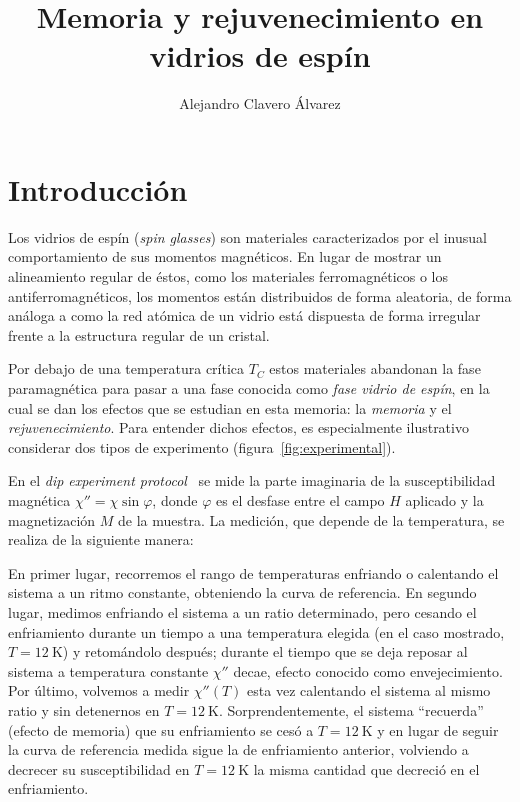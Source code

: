 \documentclass[11pt]{report}
\title{Memoria y rejuvenecimiento en vidrios de espín}
\author{Alejandro Clavero Álvarez}
\newcommand{\sub}[1]{ _{{\scriptscriptstyle \mathit{#1}}}  }
\begin{document}





\tableofcontents


\chapter{Introducción}

Los vidrios de espín
(\textit{spin glasses}) son materiales
caracterizados por el inusual comportamiento de sus momentos
magnéticos. En lugar de mostrar un alineamiento regular de éstos, como
los materiales ferromagnéticos o los antiferromagnéticos, los momentos
están distribuidos de forma aleatoria, de forma análoga a como la red
atómica de un vidrio está dispuesta de forma irregular frente a la
estructura regular de un cristal.

Por debajo de una temperatura crítica $T\sub{C}$ estos
materiales abandonan la fase paramagnética para pasar a una fase
conocida como \emph{fase vidrio de espín}, en la cual se dan los
efectos que se estudian en esta memoria: la \emph{memoria} y el
\emph{rejuvenecimiento}. Para entender dichos efectos, es
especialmente ilustrativo considerar dos tipos de experimento
(figura~\ref{fig:experimental}).

En el \textit{dip experiment protocol}~\cite{dippaper} se mide la
parte imaginaria de la susceptibilidad magnética $χ''=χ \sin φ$, donde
$φ$ es el desfase entre el campo $H$ aplicado y la magnetización $M$
de la muestra. La medición, que depende de la temperatura, se realiza
de la siguiente manera:

En primer lugar, recorremos el rango de temperaturas enfriando o
calentando el sistema a un ritmo constante, obteniendo la curva de
referencia. En segundo lugar, medimos enfriando el sistema a un ratio
determinado, pero cesando el enfriamiento durante un tiempo a una
temperatura elegida (en el caso mostrado, $T=\SI{12}{\K}$) y
retomándolo después; durante el tiempo que se deja reposar al sistema
a temperatura constante $χ''$ decae, efecto conocido como
envejecimiento. Por último, volvemos a medir $χ''(T)$ esta vez
calentando el sistema al mismo ratio y sin detenernos en
$T=\SI{12}{\K}$. Sorprendentemente, el sistema ``recuerda'' (efecto de
memoria) que su enfriamiento se cesó a $T=\SI{12}{\K}$ y en lugar de
seguir la curva de referencia medida sigue la de enfriamiento anterior,
volviendo a decrecer su susceptibilidad en $T=\SI{12}{\K}$ la misma
cantidad que decreció en el enfriamiento.
\end{document}
